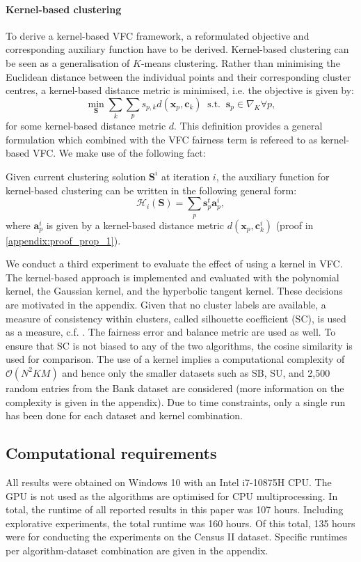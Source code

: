 \paragraph{Kernel-based clustering} \label{par:kbc} 
To derive a kernel-based VFC framework, a reformulated objective and corresponding auxiliary function have to be derived. Kernel-based clustering can be seen as a generalisation of $K$-means clustering. Rather than minimising the Euclidean distance between the individual points and their corresponding cluster centres, a kernel-based distance metric is minimised, i.e. the objective is given by:
\begin{equation}
\label{eq:KBC_objective}
    \min_{\mathbf{S}} \sum_k \sum_p s_{p, k} d(\textbf{x}_p, \textbf{c}_k) ~\text{ s.t. }~ \textbf{s}_p \in \nabla_K \forall p,
\end{equation}
for some kernel-based distance metric $d$. This definition provides a general formulation which combined with the VFC fairness term is refereed to as kernel-based VFC. We make use of the following fact:
\begin{prop}\label{prop:kernel}
Given current clustering solution $\mathbf{S}^i$ at iteration $i$, the auxiliary function for kernel-based clustering can be written in the following general form:
$$\mathcal{H}_i(\mathbf{S}) = \sum_p \textbf{s}_p^t  \textbf{a}_p^i,$$
where $\bm{a}_p^i$ is given by a kernel-based distance metric $d(\bm{x}_p, \bm{c}_k^i)$ (proof in \autoref{appendix:proof_prop_1}).
\end{prop}
We conduct a third experiment to evaluate the effect of using a kernel in VFC. The kernel-based approach is implemented and evaluated with the polynomial kernel, the Gaussian kernel, and the hyperbolic tangent kernel. These decisions are motivated in the appendix.
Given that no cluster labels are available, a measure of consistency within clusters, called silhouette coefficient (SC), is used as a measure, c.f. \citep{dinh2019estimating}. The fairness error and balance metric are used as well. To ensure that SC is not biased to any of the two algorithms, the cosine similarity is used for comparison. The use of a kernel implies a computational complexity of $\mathcal{O}(N^2KM)$ and hence only the smaller datasets such as SB, SU, and 2,500 random entries from the Bank dataset are considered (more information on the complexity is given in the appendix). Due to time constraints, only a single run has been done for each dataset and kernel combination. 

\subsection{Computational requirements}
All results were obtained on Windows 10 with an Intel i7-10875H CPU. The GPU is not used as the algorithms are optimised for CPU multiprocessing. In total, the runtime of all reported results in this paper was 107 hours. Including explorative experiments, the total runtime was 160 hours. Of this total, 135 hours were for conducting the experiments on the Census II dataset. Specific runtimes per algorithm-dataset combination are given in the appendix.


